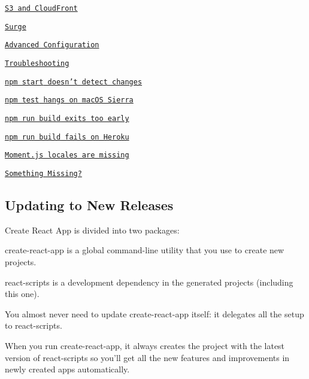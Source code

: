 \begin{DoxyItemize}
\begin{DoxyItemize}
\item \href{#s3-and-cloudfront}{\tt S3 and Cloud\+Front}
\item \href{#surge}{\tt Surge}
\end{DoxyItemize}
\item \href{#advanced-configuration}{\tt Advanced Configuration}
\item \href{#troubleshooting}{\tt Troubleshooting}
\begin{DoxyItemize}
\item \href{#npm-start-doesnt-detect-changes}{\tt {\ttfamily npm start} doesn’t detect changes}
\item \href{#npm-test-hangs-on-macos-sierra}{\tt {\ttfamily npm test} hangs on mac\+OS Sierra}
\item \href{#npm-run-build-exits-too-early}{\tt {\ttfamily npm run build} exits too early}
\item \href{#npm-run-build-fails-on-heroku}{\tt {\ttfamily npm run build} fails on Heroku}
\item \href{#momentjs-locales-are-missing}{\tt Moment.\+js locales are missing}
\end{DoxyItemize}
\item \href{#something-missing}{\tt Something Missing?}
\end{DoxyItemize}

\subsection*{Updating to New Releases}

Create React App is divided into two packages\+:


\begin{DoxyItemize}
\item {\ttfamily create-\/react-\/app} is a global command-\/line utility that you use to create new projects.
\item {\ttfamily react-\/scripts} is a development dependency in the generated projects (including this one).
\end{DoxyItemize}

You almost never need to update {\ttfamily create-\/react-\/app} itself\+: it delegates all the setup to {\ttfamily react-\/scripts}.

When you run {\ttfamily create-\/react-\/app}, it always creates the project with the latest version of {\ttfamily react-\/scripts} so you’ll get all the new features and improvements in newly created apps automatically.


